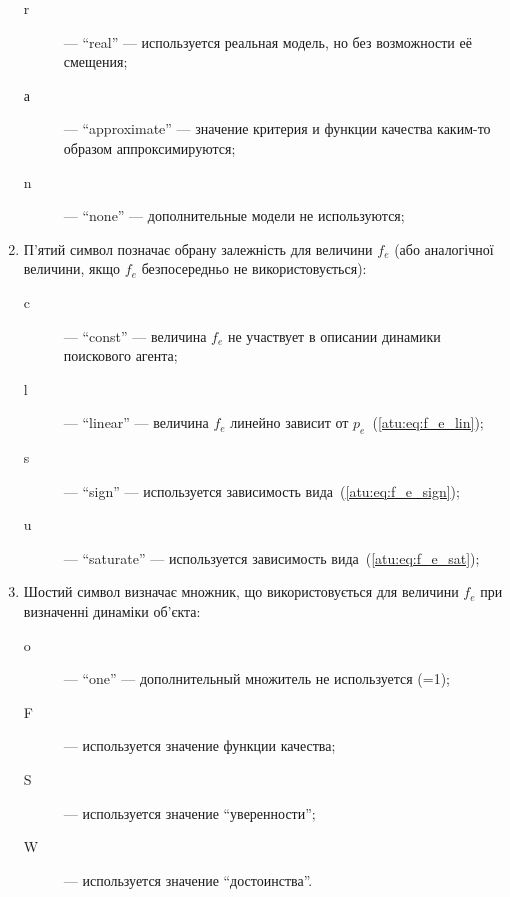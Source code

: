 \begin{enumerate}
\begin{description}
      \item[r] --- ``real'' ---
        используется реальная модель, но без возможности её смещения;

      \item[а] --- ``approximate'' ---
        значение критерия и функции качества каким-то образом аппроксимируются;

      \item[n] --- ``none'' ---
        дополнительные модели не используются;

    \end{description}

  \item
    П'ятий символ
    позначає обрану залежність для величини $f_e$ (або
    аналогічної величини, якщо $f_e$ безпосередньо не використовується):
    \begin{description}

      \item[c]  --- ``const'' ---
        величина $f_e$ не участвует в описании динамики поискового агента;

      \item[l] --- ``linear'' ---
        величина $f_e$ линейно зависит от $p_e$~(\ref{atu:eq:f_e_lin});

      \item[s] --- ``sign'' ---
        используется зависимость вида~(\ref{atu:eq:f_e_sign});

      \item[u] --- ``saturate'' ---
        используется зависимость вида~(\ref{atu:eq:f_e_sat});

    \end{description}

  \item
    Шостий символ  визначає множник,
    що використовується для величини $f_e$ при визначенні динаміки об'єкта:
    \begin{description}

      \item[o]  --- ``one'' ---
        дополнительный множитель не используется (=1);

      \item[F] ---
        используется значение функции качества;

      \item[S] ---
        используется значение ``уверенности'';

      \item[W] ---
        используется значение ``достоинства''.


\end{description}
\end{enumerate}
